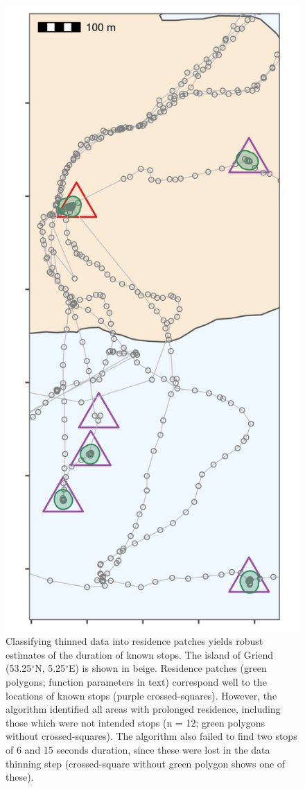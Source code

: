 \documentclass[
]{scrartcl}
\begin{document}
\begin{figure}
\centering
\includegraphics{figures/fig_calib_residence.png}
\caption{Classifying thinned data into residence patches yields robust estimates of the duration of known stops. The island of Griend (53.25\(^{\circ}\)N, 5.25\(^{\circ}\)E) is shown in beige. Residence patches (green polygons; function parameters in text) correspond well to the locations of known stops (purple crossed-squares). However, the algorithm identified all areas with prolonged residence, including those which were not intended stops (n = 12; green polygons without crossed-squares). The algorithm also failed to find two stops of 6 and 15 seconds duration, since these were lost in the data thinning step (crossed-square without green polygon shows one of these).}
\end{figure}
\end{document}
